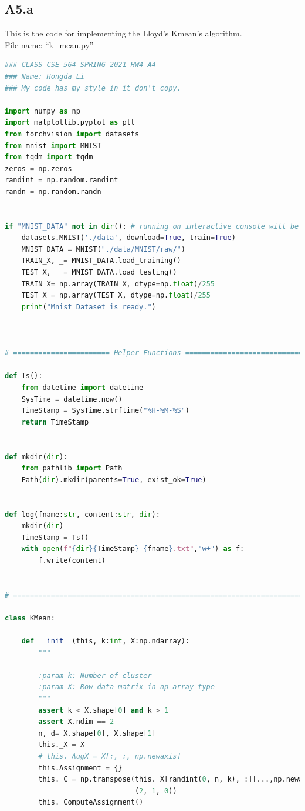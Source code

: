 \documentclass[]{article}
\begin{document}
    \subsection*{A5.a}\label{A5.a}
        This is the code for implementing the Lloyd's Kmean's algorithm. 
        \\[1.1em]
        File name: ``k\_mean.py''
        \begin{lstlisting}[language=python]
### CLASS CSE 564 SPRING 2021 HW4 A4
### Name: Hongda Li
### My code has my style in it don't copy.

import numpy as np
import matplotlib.pyplot as plt
from torchvision import datasets
from mnist import MNIST
from tqdm import tqdm
zeros = np.zeros
randint = np.random.randint
randn = np.random.randn


if "MNIST_DATA" not in dir(): # running on interactive console will be faster
    datasets.MNIST('./data', download=True, train=True)
    MNIST_DATA = MNIST("./data/MNIST/raw/")
    TRAIN_X, _= MNIST_DATA.load_training()
    TEST_X, _ = MNIST_DATA.load_testing()
    TRAIN_X= np.array(TRAIN_X, dtype=np.float)/255
    TEST_X = np.array(TEST_X, dtype=np.float)/255
    print("Mnist Dataset is ready.")



# ======================= Helper Functions =====================================

def Ts():
    from datetime import datetime
    SysTime = datetime.now()
    TimeStamp = SysTime.strftime("%H-%M-%S")
    return TimeStamp


def mkdir(dir):
    from pathlib import Path
    Path(dir).mkdir(parents=True, exist_ok=True)


def log(fname:str, content:str, dir):
    mkdir(dir)
    TimeStamp = Ts()
    with open(f"{dir}{TimeStamp}-{fname}.txt","w+") as f:
        f.write(content)


# ==============================================================================

class KMean:

    def __init__(this, k:int, X:np.ndarray):
        """

        :param k: Number of cluster
        :param X: Row data matrix in np array type
        """
        assert k < X.shape[0] and k > 1
        assert X.ndim == 2
        n, d= X.shape[0], X.shape[1]
        this._X = X
        # this._AugX = X[:, :, np.newaxis]
        this.Assignment = {}
        this._C = np.transpose(this._X[randint(0, n, k), :][...,np.newaxis],
                               (2, 1, 0))
        this._ComputeAssignment()


\end{lstlisting}
\end{document}

